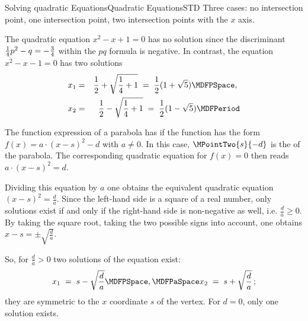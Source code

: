 \begin{MXContent}{Solving quadratic Equations}{Quadratic Equations}{STD}
Three cases: no intersection point, one intersection point, two intersection points with the
$x$ axis.


\begin{MExample}
The quadratic equation $x^2-x+1=0$ has no solution since the discriminant $\tfrac{1}{4}p^2-q=-\tfrac{3}{4}$
within the $p q$ formula is negative.
In contrast, the equation $x^2-x-1=0$ has two solutions
\begin{eqnarray*}
x_1 &=& \Mdfrac12+\sqrt{\Mdfrac14+1} \;=\; \Mdfrac12(1+\sqrt5) \MDFPSpace ,\ \\
x_2 &=& \Mdfrac12-\sqrt{\Mdfrac14+1} \;=\; \Mdfrac12(1-\sqrt5) \MDFPeriod
\end{eqnarray*}
\end{MExample}

\begin{MInfo}
The function expression of a parabola has  if the function
has the form $f(x)=a\cdot (x-s)^2-d$ with $a\ne 0$. In this case, $\MPointTwo{s}{-d}$
is the  of the parabola. The corresponding 
quadratic equation for $f(x)=0$ then reads $a\cdot (x-s)^2=d$.

Dividing this equation by $a$ one obtains the equivalent quadratic equation 
$(x-s)^2=\frac{d}{a}$. Since the left-hand side is a square of a real number, only 
solutions exist if and only if the right-hand side is non-negative as well, i.e.
$\frac{d}{a}\ge 0$. By taking the square root, taking the two possible signs into
account, one obtains $x-s=\pm\sqrt{\frac{d}{a}}$.

So, for $\frac{d}{a}>0$ two solutions of the equation exist:
$$
x_1 \;=\; s-\sqrt{\Mdfrac{d}{a}} \MDFPSpace,\MDFPaSpace x_2 \;=\; s+\sqrt{\Mdfrac{d}{a}}\,;
$$
they are symmetric to the $x$ coordinate $s$ of the vertex. For $d=0$, only one
solution exists.


\end{MInfo}
\end{MXContent}
